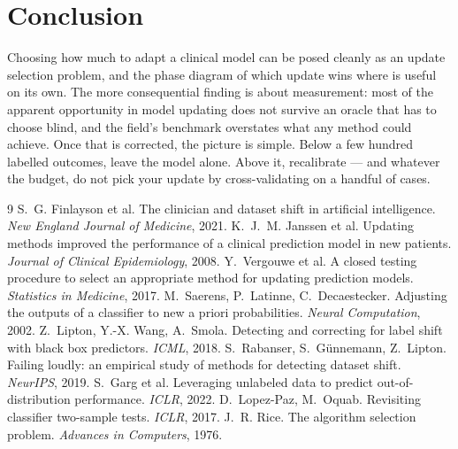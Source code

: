 \documentclass[10pt,twocolumn]{article}
\begin{document}
\section{Conclusion}
Choosing how much to adapt a clinical model can be posed cleanly as an update
selection problem, and the phase diagram of which update wins where is useful
on its own. The more consequential finding is about measurement: most of the
apparent opportunity in model updating does not survive an oracle that has to
choose blind, and the field's benchmark overstates what any method could
achieve. Once that is corrected, the picture is simple. Below a few hundred
labelled outcomes, leave the model alone. Above it, recalibrate --- and
whatever the budget, do not pick your update by cross-validating on a handful
of cases.

\begin{thebibliography}{9}
\small
{} S.~G. Finlayson et al. The clinician and dataset
shift in artificial intelligence. \emph{New England Journal of Medicine},
2021.
 K.~J.~M. Janssen et al. Updating methods improved the
performance of a clinical prediction model in new patients. \emph{Journal of
Clinical Epidemiology}, 2008.
 Y.~Vergouwe et al. A closed testing procedure to
select an appropriate method for updating prediction models.
\emph{Statistics in Medicine}, 2017.
 M.~Saerens, P.~Latinne, C.~Decaestecker. Adjusting the
outputs of a classifier to new a priori probabilities.
\emph{Neural Computation}, 2002.
 Z.~Lipton, Y.-X. Wang, A.~Smola. Detecting and
correcting for label shift with black box predictors. \emph{ICML}, 2018.
 S.~Rabanser, S.~G\"unnemann, Z.~Lipton. Failing
loudly: an empirical study of methods for detecting dataset shift.
\emph{NeurIPS}, 2019.
 S.~Garg et al. Leveraging unlabeled data to predict
out-of-distribution performance. \emph{ICLR}, 2022.
 D.~Lopez-Paz, M.~Oquab. Revisiting classifier
two-sample tests. \emph{ICLR}, 2017.
 J.~R. Rice. The algorithm selection problem.
\emph{Advances in Computers}, 1976.
\end{thebibliography}
\end{document}
